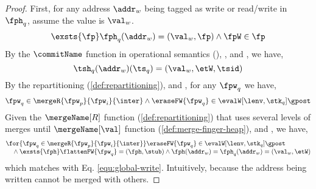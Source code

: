 \begin{proof}
First, for any address \( \addr_{w} \) being tagged as write or read/write in \( \fph_{q} \), assume the value is \( \val_{w} \).
\begin{equation}
    \label{equ:local-write}
    \exsts{\fp} 
    \fph_{q}(\addr_{w}) = (\val_{w}, \fp)
    \land \fpW \in \fp
\end{equation}
By the \( \commitName \) function in operational semantics (), ,  and , we have,
\begin{equation}
    \label{equ:global-write}
    \tsh_{q}(\addr_{w})(\ts_{q}) = (\val_{w}, \etW, \tsid)
\end{equation}
By the repartitioning ( \ref{def:repartitioning}),  and , for any \( \fpw_{q} \) we have,
\begin{equation*}
    \fpw_{q} \in \mergeR{\fpw_{p}}{\fpw_{i}}{\inter} \land \eraseFW{\fpw_{q}} \in \evalW[\lenv, \stk_{q}]{\gpost}
\end{equation*}
Given the \( \mergeName[R] \) function ( \ref{def:repartitioning}) that uses several levels of merges until \( \mergeName[\val] \) function ( \ref{def:merge-finger-heap}),  and , we have,
\begin{equation}
    \label{equ:write-remain-the-same}
    \begin{array}{@{}l@{}}
      \for{ \fpw_{q} \in \mergeR{\fpw_{p}}{\fpw_{i}}{\inter} }  
      \eraseFW{\fpw_{q}} \in \evalW[\lenv, \stk_{q}]{\gpost} \\
      \quad {} \land \exsts{\fph} \flattenFW{\fpw_{q}} = (\fph, \stub) \land \fph(\addr_{w}) = \fph_{q}(\addr_{w}) = (\val_{w}, \etW)
    \end{array}
\end{equation}
which matches with Eq. \eqref{equ:global-write}.
Intuitively, because the address being written cannot be merged with others.


\end{proof}
